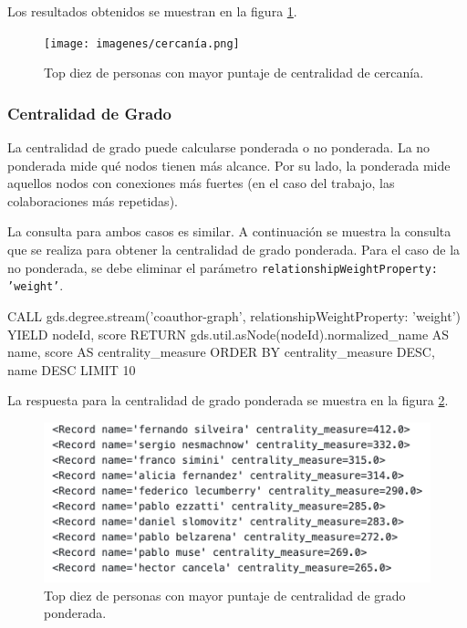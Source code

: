 \documentclass[journal]{IEEEtran}
\begin{document}
Los resultados obtenidos se muestran en la figura \ref{fig:cercania}.

\begin{figure}[b]
	\centering
	\texttt{[image: imagenes/cercanía.png]}
	\caption{Top diez de personas con mayor puntaje de centralidad de cercanía.}
	\label{fig:cercania}
\end{figure}

\subsubsection{Centralidad de Grado}

La centralidad de grado puede calcularse ponderada o no ponderada. La no ponderada mide qué nodos tienen más alcance. Por su lado, la ponderada mide aquellos nodos con conexiones más fuertes (en el caso del trabajo, las colaboraciones más repetidas).

La consulta para ambos casos es similar. A continuación se muestra la consulta que se realiza para obtener la centralidad de grado ponderada. Para el caso de la no ponderada, se debe eliminar el parámetro \texttt{{relationshipWeightProperty: 'weight'}}.

\begin{sflisting}[style=sparql,caption= Centralidad de Grado,label=grado_ponderado]
	CALL gds.degree.stream('coauthor-graph',
	{relationshipWeightProperty: 'weight'})
	YIELD nodeId, score
	RETURN gds.util.asNode(nodeId).normalized_name AS name,
	score AS centrality_measure
	ORDER BY centrality_measure DESC, name DESC
	LIMIT 10
\end{sflisting}

La respuesta para la centralidad de grado ponderada se muestra en la figura \ref{fig:grado_ponderada}.

\begin{figure}[t]
	\centering
	\includegraphics[width=\linewidth]{imagenes/pesos_grado.png}
	\caption{Top diez de personas con mayor puntaje de centralidad de grado ponderada.}
	\label{fig:grado_ponderada}
\end{figure}
\end{document}
